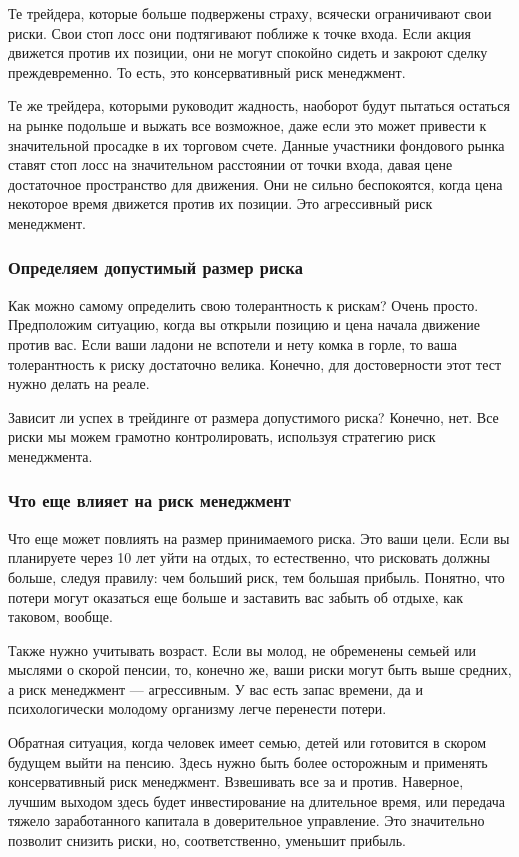 \documentclass[a5paper]{article}
\begin{document}
Те трейдера, которые больше подвержены страху, всячески ограничивают свои риски. Свои стоп лосс они подтягивают поближе к точке входа. Если акция движется против их позиции, они не могут спокойно сидеть и закроют сделку преждевременно. То есть, это консервативный риск менеджмент.

Те же трейдера, которыми руководит жадность, наоборот будут пытаться
остаться на рынке подольше и выжать все возможное, даже если это может
привести к значительной просадке в их торговом счете. Данные участники
фондового рынка ставят стоп лосс на значительном расстоянии от точки
входа, давая цене достаточное пространство для движения. Они не сильно
беспокоятся, когда цена некоторое время движется против их
позиции. Это агрессивный риск менеджмент.

\subsubsection{Определяем допустимый размер риска}

Как можно самому определить свою толерантность к рискам? Очень просто. Предположим ситуацию, когда вы открыли позицию и цена начала движение против вас. Если ваши ладони не вспотели и нету комка в горле, то ваша толерантность к риску достаточно велика. Конечно, для достоверности этот тест нужно делать на реале.

Зависит ли успех в трейдинге от размера допустимого риска? Конечно,
нет. Все риски мы можем грамотно контролировать, используя стратегию
риск менеджмента.

\subsubsection{Что еще влияет на риск менеджмент}

Что еще может повлиять на размер принимаемого риска. Это ваши цели. Если вы планируете через 10 лет уйти на отдых, то естественно, что рисковать должны больше, следуя правилу: чем больший риск, тем большая прибыль. Понятно, что потери могут оказаться еще больше и заставить вас забыть об отдыхе, как таковом, вообще.

Также нужно учитывать возраст. Если вы молод, не обременены семьей или мыслями о скорой пенсии, то, конечно же, ваши риски могут быть выше средних, а риск менеджмент — агрессивным. У вас есть запас времени, да и психологически молодому организму легче перенести потери.

Обратная ситуация, когда человек имеет семью, детей или готовится в скором будущем выйти на пенсию. Здесь нужно быть более осторожным и применять консервативный риск менеджмент. Взвешивать все за и против. Наверное, лучшим выходом здесь будет инвестирование на длительное время, или передача тяжело заработанного капитала в доверительное управление. Это значительно позволит снизить риски, но, соответственно, уменьшит прибыль.
\end{document}
